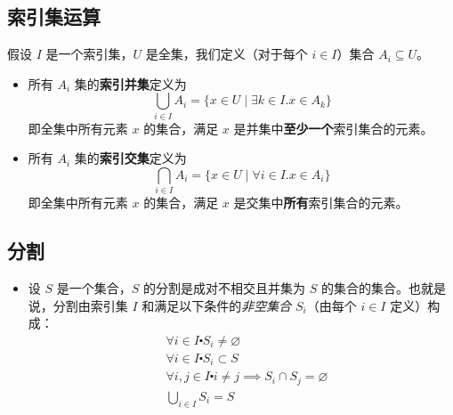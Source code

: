 \subsection{索引集运算}

假设 $I$ 是一个索引集，$U$ 是全集，我们定义（对于每个 $i \in I$）集合 $A_i \subseteq U$。

\begin{itemize}
    \item 所有 $A_i$ 集的\textbf{索引并集}定义为
        \[\bigcup_{i \in I}A_i = \{x \in U \mid \exists k \in I. x \in A_k\}\]
        即全集中所有元素 $x$ 的集合，满足 $x$ 是并集中\textbf{至少一个}索引集合的元素。
    \item 所有 $A_i$ 集的\textbf{索引交集}定义为
        \[\bigcap_{i \in I}A_i = \{x \in U \mid \forall i \in I.x \in A_i\}\]
        即全集中所有元素 $x$ 的集合，满足 $x$ 是交集中\textbf{所有}索引集合的元素。
\end{itemize}

\subsection{分割}

\begin{itemize}
    \item 设 $S$ 是一个集合，$S$ 的分割是成对不相交且并集为 $S$ 的集合的集合。也就是说，分割由索引集 $I$ 和满足以下条件的\emph{非空集合} $S_i$（由每个 $i \in I$ 定义）构成：
        \begin{align*}
            & \forall i \in I \centerdot S_i \ne \varnothing\\
            & \forall i \in I \centerdot S_i \subset S\\
            & \forall i,j \in I \centerdot i \ne j \implies S_i \cap S_j = \varnothing\\
            & \bigcup_{i \in I} S_i= S
        \end{align*}
\end{itemize}


